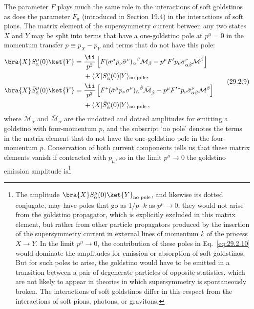 The parameter \(F\) plays much the same role in the interactions of soft
goldstinos as does the parameter \(F_\pi\) (introduced in Section 19.4) in
the interactions of soft pions. The matrix element of the supersymmetry
current between any two states \(X\) and \(Y\) may be split into terms
that have a one-goldstino pole at \(p^\mu=0\) in the momentum transfer
\(p\equiv p_X-p_Y\) and terms that do not have this pole:
\begin{equation}
  \begin{aligned}
  \bra{X} S^\mu_\alpha(0)\ket{Y}
  ={}&\frac{\ii}{p^2}\left[
    F(\sigma^\mu p_\nu\bar\sigma^\nu)_\alpha{}^\beta
      \mathcal M_\beta
    -p^\mu F'p_\nu\sigma^\nu_{\alpha\dot\beta}
      \bar{\mathcal M}^{\dot\beta}\right]
  \\
  &+\langle X\lvert S^\mu_\alpha(0)
      \rvert Y\rangle_{\text{no pole}},
  \\
  \bra{X}\bar S^\mu_{\dot\alpha}(0)\ket{Y}
  ={}&\frac{\ii}{p^2}\left[
    F^*(\bar\sigma^\mu p_\nu\sigma^\nu)_{\dot\alpha}{}^{\dot\beta}
      \bar{\mathcal M}_{\dot\beta}
    -p^\mu F'{}^*p_\nu\bar\sigma^{\nu}_{\dot\alpha\beta}
      \mathcal M^\beta\right]
  \\
  &+\langle X\lvert\bar S^\mu_{\dot\alpha}(0)
      \rvert Y\rangle_{\text{no pole}}\,,
  \end{aligned}
  \tag{29.2.9}\label{eq:29.2.9}
\end{equation}
where \(\mathcal M_\alpha\) and
\(\bar{\mathcal M}_{\dot\alpha}\) are the undotted and dotted amplitudes
for emitting a goldstino with four-momentum \(p\), and the subscript
`no pole' denotes the terms in the matrix element that do not have the
one-goldstino pole in the four-momentum \(p\). Conservation of both current
components tells us that these matrix elements vanish if contracted with \(p_\mu\),
so in the limit \(p^\mu\to0\) the goldstino emission amplitude
is\footnote{The amplitude
\(\bra{X} S^\mu_\alpha(0)\ket{Y}_{\text{no pole}}\),
and likewise its dotted conjugate, may have
poles that go as \(1/p\mathbin{\cdot}k\) as \(p^\mu\to0\); they would not
arise from the goldstino propagator, which is explicitly excluded in this
matrix element, but rather from other particle propagators produced by the
insertion of the supersymmetry current in external lines of momentum \(k\)
of the process \(X\to Y\). In the limit \(p^\mu\to0\), the contribution
of these poles in Eq.~\eqref{eq:29.2.10} would dominate the amplitudes for
emission or absorption of soft goldstinos. But for such poles to arise,
the goldstino would have to be emitted in a transition between a pair of
degenerate particles of opposite statistics, which are not likely to
appear in theories in which supersymmetry is spontaneously broken. The
interactions of soft goldstinos differ in this respect from the
interactions of soft pions, photons, or gravitons.}
